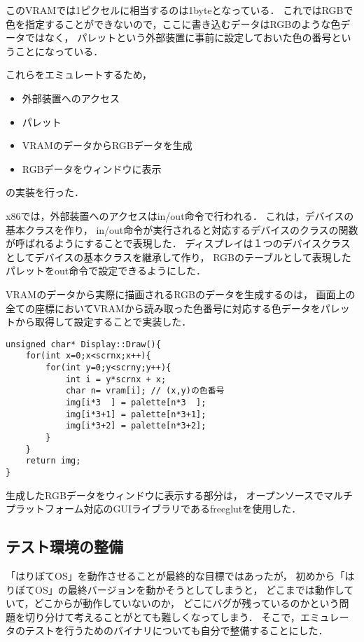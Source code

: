 \documentclass[10pt,a4j]{jsarticle}
\begin{document}
このVRAMでは1ピクセルに相当するのは1byteとなっている．
これではRGBで色を指定することができないので，ここに書き込むデータはRGBのような色データではなく，
パレットという外部装置に事前に設定しておいた色の番号ということになっている．

これらをエミュレートするため，
\begin{itemize}
	\item 外部装置へのアクセス
	\item パレット
	\item VRAMのデータからRGBデータを生成
	\item RGBデータをウィンドウに表示
\end{itemize}
の実装を行った．

x86では，外部装置へのアクセスはin/out命令で行われる．
これは，デバイスの基本クラスを作り，
in/out命令が実行されると対応するデバイスのクラスの関数が呼ばれるようにすることで表現した．
ディスプレイは１つのデバイスクラスとしてデバイスの基本クラスを継承して作り，
RGBのテーブルとして表現したパレットをout命令で設定できるようにした．

VRAMのデータから実際に描画されるRGBのデータを生成するのは，
画面上の全ての座標においてVRAMから読み取った色番号に対応する色データをパレットから取得して設定することで実装した．

\begin{lstlisting}
unsigned char* Display::Draw(){
	for(int x=0;x<scrnx;x++){
		for(int y=0;y<scrny;y++){
			int i = y*scrnx + x;
			char n= vram[i]; // (x,y)の色番号
			img[i*3  ] = palette[n*3  ];
			img[i*3+1] = palette[n*3+1];
			img[i*3+2] = palette[n*3+2];
		}
	}
	return img;
}
\end{lstlisting}

生成したRGBデータをウィンドウに表示する部分は，
オープンソースでマルチプラットフォーム対応のGUIライブラリであるfreeglutを使用した．

\subsection{テスト環境の整備\label{impl-test-env}}

「はりぼてOS」を動作させることが最終的な目標ではあったが，
初めから「はりぼてOS」の最終バージョンを動かそうとしてしまうと，
どこまでは動作していて，どこからが動作していないのか，
どこにバグが残っているのかという問題を切り分けて考えることがとても難しくなってしまう．
そこで，エミュレータのテストを行うためのバイナリについても自分で整備することにした．
\end{document}
